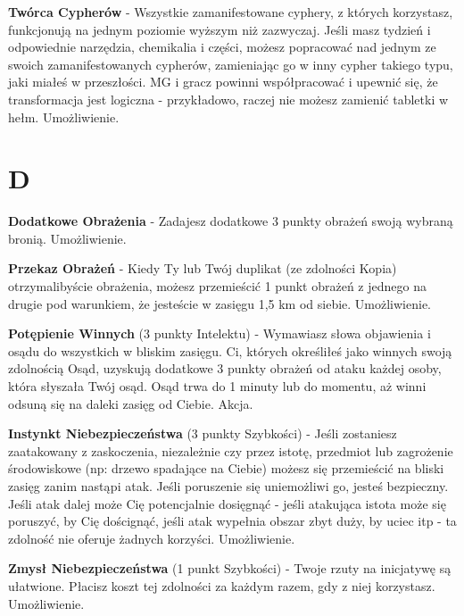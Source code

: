{\textbf{Twórca Cypherów}\label{sec:Twórca Cypherów} - Wszystkie zamanifestowane cyphery, z których korzystasz, funkcjonują na jednym poziomie wyższym niż zazwyczaj. Jeśli masz tydzień i odpowiednie narzędzia, chemikalia i części, możesz popracować nad jednym ze swoich zamanifestowanych cypherów, zamieniając go w inny cypher takiego typu, jaki miałeś w przeszłości. MG i gracz powinni współpracować i upewnić się, że transformacja jest logiczna - przykładowo, raczej nie możesz zamienić tabletki w hełm. Umożliwienie. 

\section{D}

\textbf{Dodatkowe Obrażenia}\label{sec:Dodatkowe Obrażenia} - Zadajesz dodatkowe 3 punkty obrażeń swoją wybraną bronią. Umożliwienie. 

\textbf{Przekaz Obrażeń}\label{sec:Przekaz Obrażeń} - Kiedy Ty lub Twój duplikat (ze zdolności Kopia) otrzymalibyście obrażenia, możesz przemieścić 1 punkt obrażeń z jednego na drugie pod warunkiem, że jesteście w zasięgu 1,5 km od siebie. Umożliwienie. 

\textbf{Potępienie Winnych}\label{sec:Potępienie Winnych} (3 punkty Intelektu) - Wymawiasz słowa objawienia i osądu do wszystkich w bliskim zasięgu. Ci, których określiłeś jako winnych swoją zdolnością Osąd, uzyskują dodatkowe 3 punkty obrażeń od ataku każdej osoby, która słyszała Twój osąd. Osąd trwa do 1 minuty lub do momentu, aż winni odsuną się na daleki zasięg od Ciebie. Akcja.

\textbf{Instynkt Niebezpieczeństwa}\label{sec:Instynkt Niebezpieczeństwa} (3 punkty Szybkości) - Jeśli zostaniesz zaatakowany z zaskoczenia, niezależnie czy przez istotę, przedmiot lub zagrożenie środowiskowe (np: drzewo spadające na Ciebie) możesz się przemieścić na bliski zasięg zanim nastąpi atak. Jeśli poruszenie się uniemożliwi go, jesteś bezpieczny. Jeśli atak dalej może Cię potencjalnie dosięgnąć - jeśli atakująca istota może się poruszyć, by Cię doścignąć, jeśli atak wypełnia obszar zbyt duży, by uciec itp - ta zdolność nie oferuje żadnych korzyści. Umożliwienie.

\textbf{Zmysł Niebezpieczeństwa}\label{sec:Zmysł Niebezpieczeństwa} (1 punkt Szybkości) - Twoje rzuty na inicjatywę są ułatwione. Płacisz koszt tej zdolności za każdym razem, gdy z niej korzystasz. Umożliwienie.

}
